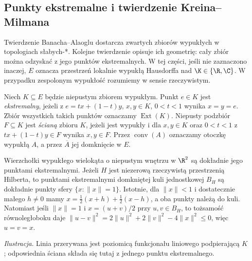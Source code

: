 \subsection{Punkty ekstremalne i twierdzenie Kreina--Milmana}
\label{subsec:krein-milman}

Twierdzenie Banacha--Alaoglu dostarcza zwartych zbiorów wypukłych
w topologiach słabych-*. Kolejne twierdzenie opisuje ich geometrię:
cały zbiór można odzyskać z jego punktów ekstremalnych. W tej
części, jeśli nie zaznaczono inaczej, $E$ oznacza przestrzeń
lokalnie wypukłą Hausdorffa nad $\K\in\{\R,\C\}$. W przypadku
zespolonym wypukłość rozumiemy w sensie rzeczywistym.

\begin{definicja}
\label{def:extreme-face9}
Niech $K\subseteq E$ będzie niepustym zbiorem wypukłym.
Punkt $e\in K$ jest \emph{ekstremalny}, jeżeli z
$e=tx+(1-t)y$, $x,y\in K$, $0<t<1$ wynika $x=y=e$.
Zbiór wszystkich takich punktów oznaczamy $\operatorname{Ext}(K)$.
Niepusty podzbiór $F\subseteq K$ jest \emph{ścianą} zbioru $K$,
jeżeli jest wypukły i dla $x,y\in K$ oraz $0<t<1$ z
$tx+(1-t)y\in F$ wynika $x,y\in F$.
Przez $\operatorname{conv}(A)$ oznaczamy otoczkę wypukłą $A$,
a przez $\overline A$ jej domknięcie w $E$.
\end{definicja}

\begin{przyklad}
Wierzchołki wypukłego wielokąta o niepustym wnętrzu w $\R^2$ są dokładnie jego
punktami ekstremalnymi. Jeżeli $H$ jest niezerową rzeczywistą przestrzenią
Hilberta, to punktami ekstremalnymi domkniętej kuli jednostkowej
$B_H$ są dokładnie punkty sfery $\{x:\|x\|=1\}$.
Istotnie, dla $\|x\|<1$ i dostatecznie małego $h\ne0$
mamy $x=\tfrac12(x+h)+\tfrac12(x-h)$, a oba punkty należą do kuli.
Natomiast jeśli $\|x\|=1$ i $x=(u+v)/2$ przy $u,v\in B_H$,
to tożsamość równoległoboku daje
$\|u-v\|^2=2\|u\|^2+2\|v\|^2-4\|x\|^2\le0$, więc $u=v=x$.
\end{przyklad}

\begin{center}
\end{center}
\noindent
\emph{Ilustracja.} Linia przerywana jest poziomicą funkcjonału
liniowego podpierającą $K$; odpowiednia ściana składa się tutaj
z jednego punktu ekstremalnego.

